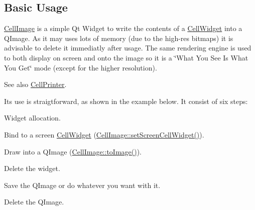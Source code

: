 \hypertarget{classHurricane_1_1CellImage_secImageBasicUsage}{}\subsection{Basic Usage}\label{classHurricane_1_1CellImage_secImageBasicUsage}
\hyperlink{classHurricane_1_1CellImage}{Cell\+Image} is a simple Qt Widget to write the contents of a \hyperlink{classHurricane_1_1CellWidget}{Cell\+Widget} into a Q\+Image. As it may uses lots of memory (due to the high-\/res bitmaps) it is advisable to delete it immediatly after usage. The same rendering engine is used to both display on screen and onto the image so it is a \char`\"{}\+What You
                   See Is What You Get\char`\"{} mode (except for the higher resolution).

\begin{DoxySeeAlso}{See also}
\hyperlink{classHurricane_1_1CellPrinter}{Cell\+Printer}.
\end{DoxySeeAlso}
It\textquotesingle{}s use is straigtforward, as shown in the example below. It consist of six steps\+: 
\begin{DoxyEnumerate}
\item Widget allocation. 
\item Bind to a screen \hyperlink{classHurricane_1_1CellWidget}{Cell\+Widget} (\hyperlink{classHurricane_1_1CellImage_a3e140125664a1088020d9bedc7de0f4e}{Cell\+Image\+::set\+Screen\+Cell\+Widget()}). 
\item Draw into a Q\+Image (\hyperlink{classHurricane_1_1CellImage_a90ed9b8a07f4302cbeecf52a95ef5578}{Cell\+Image\+::to\+Image()}). 
\item Delete the widget. 
\item Save the Q\+Image or do whatever you want with it. 
\item Delete the Q\+Image. 
\end{DoxyEnumerate}

